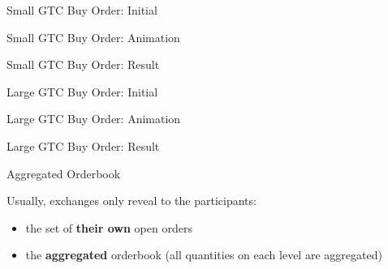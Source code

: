 \begin{frame}{Small GTC Buy Order: Initial}
  \begin{center}
    
  \end{center}
\end{frame}

\begin{frame}{Small GTC Buy Order: Animation}
  \begin{center}
  \end{center}
\end{frame}

\begin{frame}{Small GTC Buy Order: Result}
  \begin{center}
    
  \end{center}
\end{frame}

\begin{frame}{Large GTC Buy Order: Initial}
  \begin{center}
    
  \end{center}
\end{frame}

\begin{frame}{Large GTC Buy Order: Animation}
  \begin{center}
  \end{center}
\end{frame}

\begin{frame}{Large GTC Buy Order: Result}
  \begin{center}
    
  \end{center}
\end{frame}

\begin{frame}{Aggregated Orderbook}
  \begin{sqt:result}
    Usually, exchanges only reveal to the participants:
    \begin{itemize}
      \item the set of \textbf{their own} open orders
      \item the \textbf{aggregated} orderbook (all quantities on each level are aggregated)
    \end{itemize}
  \end{sqt:result}

  \begin{center}
    
  \end{center}
\end{frame}

